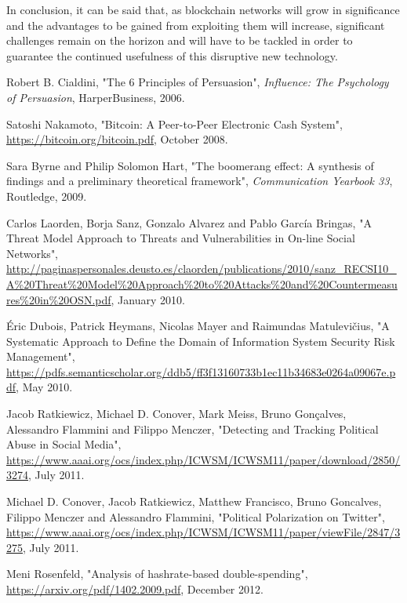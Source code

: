 \documentclass[12pt,a4paper]{article}
\begin{document}
In conclusion, it can be said that, as blockchain networks will grow in significance and the advantages to be gained from exploiting them will increase, significant challenges remain on the horizon and will have to be tackled in order to guarantee the continued usefulness of this disruptive new technology.\\

\newpage
\begin{thebibliography}{9}

Robert B. Cialdini,
"The 6 Principles of Persuasion",
\textit{Influence: The Psychology of Persuasion},
HarperBusiness, 2006.

Satoshi Nakamoto,
"Bitcoin: A Peer-to-Peer Electronic Cash System",
\url{https://bitcoin.org/bitcoin.pdf},
October 2008.

Sara Byrne and Philip Solomon Hart,
"The boomerang effect: A synthesis of findings and a preliminary theoretical framework",
\textit{Communication Yearbook 33},
Routledge, 2009.

Carlos Laorden, Borja Sanz, Gonzalo Alvarez and Pablo García Bringas,
"A Threat Model Approach to Threats and Vulnerabilities in On-line Social Networks",
\url{http://paginaspersonales.deusto.es/claorden/publications/2010/sanz_RECSI10_A%20Threat%20Model%20Approach%20to%20Attacks%20and%20Countermeasures%20in%20OSN.pdf},
January 2010.

Éric Dubois, Patrick Heymans, Nicolas Mayer and Raimundas Matulevičius,
"A Systematic Approach to Define the Domain of Information System Security Risk Management",
\url{https://pdfs.semanticscholar.org/ddb5/ff3f13160733b1ec11b34683e0264a09067e.pdf},
May 2010.

Jacob Ratkiewicz, Michael D. Conover, Mark Meiss, Bruno Gonçalves, Alessandro Flammini and Filippo Menczer,
"Detecting and Tracking Political Abuse in Social Media",
\url{https://www.aaai.org/ocs/index.php/ICWSM/ICWSM11/paper/download/2850/3274},
July 2011.

Michael D. Conover, Jacob Ratkiewicz, Matthew Francisco, Bruno Goncalves, Filippo Menczer and Alessandro Flammini,
"Political Polarization on Twitter",
\url{https://www.aaai.org/ocs/index.php/ICWSM/ICWSM11/paper/viewFile/2847/3275},
July 2011.

Meni Rosenfeld,
"Analysis of hashrate-based double-spending",
\url{https://arxiv.org/pdf/1402.2009.pdf},
December 2012.


\end{thebibliography}
\end{document}
